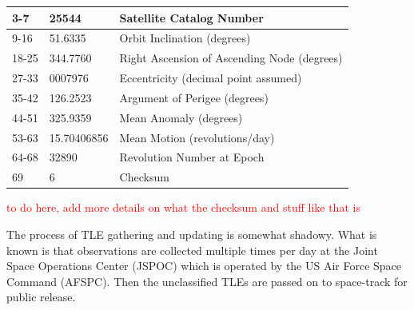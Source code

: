 \documentclass[12pt]{report}
\begin{document}
\begin{table}[h!]
{\begin{tabular}{|l|l|l|}
				3-7                                     & 25544                                   & Satellite Catalog Number                                                        \\ \hline
				9-16                                    & 51.6335                                 & Orbit Inclination (degrees)                                                     \\ \hline
				18-25                                   & 344.7760                                & Right Ascension of Ascending Node (degrees)                                     \\ \hline
				27-33                                   & 0007976                                 & Eccentricity (decimal point assumed)                                            \\ \hline
				35-42                                   & 126.2523                                & Argument of Perigee (degrees)                                                   \\ \hline
				44-51                                   & 325.9359                                & Mean Anomaly (degrees)                                                          \\ \hline
				53-63                                   & 15.70406856                             & Mean Motion (revolutions/day)                                                   \\ \hline
				64-68                                   & 32890                                   & Revolution Number at Epoch                                                      \\ \hline
				69                                      & 6                                       & Checksum                                                                        \\ \hline
			\end{tabular}%
		}
	\end{table}
	
	

	\textcolor{red}{to do here, add more details on what the checksum and stuff like that is}
	
	\par 
		\doublespacing
	The process of TLE gathering and updating is somewhat shadowy. \cite{vallado2012two} What is known is that observations are collected multiple times per day at the Joint
	Space Operations Center (JSPOC) which is operated by the US Air Force Space Command (AFSPC). Then the unclassified TLEs are passed on to space-track for public release.  
	
\end{document}
